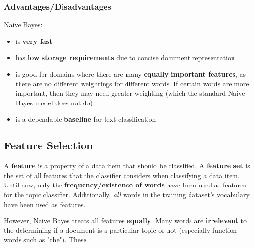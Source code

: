 \documentclass{article}
\begin{document}
\subsubsection{Advantages/Disadvantages}

Naive Bayes:
\begin{itemize}
	\item is \textbf{very fast}
	\item has \textbf{low storage requirements} due to concise document representation
	\item is good for domains where there are many \textbf{equally important features}, as there are no different weightings for different words. If certain words are more important, then they may need greater weighting (which the standard Naive Bayes model does not do)
	\item is a dependable \textbf{baseline} for text classification
\end{itemize}

\subsection{Feature Selection}

A \textbf{feature} is a property of a data item that should be classified.	A \textbf{feature set} is the set of all features that the classifier considers when classifying a data item. Until now, only the \textbf{frequency/existence of words} have been used as features for the topic classifier. Additionally, \textit{all} words in the training dataset's vocabulary have been used as features.

However, Naive Bayes treats all features \textbf{equally}. Many words are \textbf{irrelevant} to the determining if a document is a particular topic or not (especially function words such as "the"). These 
\end{document}
